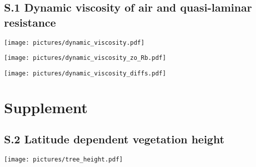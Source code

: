 \documentclass[manuscript]{copernicus}
\begin{document}
\clearpage
\setcounter{page}{1}

\subsection*{S.1 Dynamic viscosity of air and quasi-laminar resistance}
\begin{center}
  \texttt{[image: pictures/dynamic\_viscosity.pdf]}
\end{center}
\begin{center}
  \texttt{[image: pictures/dynamic\_viscosity\_zo\_Rb.pdf]}
\end{center}
\begin{center}
  \texttt{[image: pictures/dynamic\_viscosity\_diffs.pdf]}
\end{center}

\section*{Supplement}
\subsection*{S.2 Latitude dependent vegetation height}
\begin{center}
  \texttt{[image: pictures/tree\_height.pdf]}
\end{center}
\end{document}
